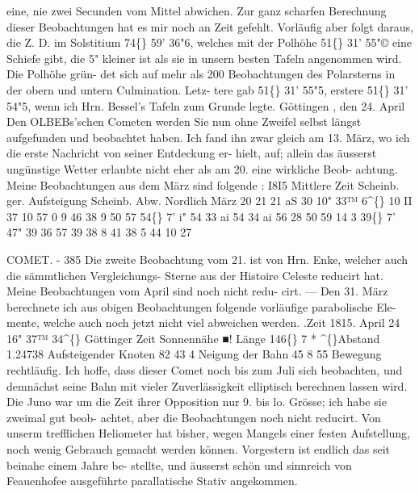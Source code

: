 \documentclass[12pt,a4paper]{article}
\newcommand{\degree}{\textdegree}
\begin{document}
eine,  nie  zwei  Secunden  vom  Mittel  abwichen. 
Zur  ganz  scharfen  Berechnung  dieser  Beobachtungen  hat  es  mir  noch  an  Zeit  gefehlt.  Vorläufig 
aber  folgt  daraus,  die  Z.  D.  im  Solstitium  74\degree\{\}  59'  36"6,  welches  mit  der  Polhöhe  51\degree\{\}  31'  55"©  eine 
Schiefe  gibt,  die  5"  kleiner  ist  als  sie  in  unsern  besten  Tafeln  angenommen  wird.  Die  Polhöhe  grün- 
det sich  auf  mehr  als  200  Beobachtungen  des  Polarsterns  in  der  obern  und  untern  Culmination.  Letz- 
tere gab  51\degree\{\}  31'  55"5,  erstere   51\degree\{\}  31'  54"5,  wenn  ich  Hrn.  Bessel's  Tafeln  zum  Grunde  legte. 
Göttingen ,  den  24.  April 
Den  OLBEBs'schen  Cometen  werden  Sie  nun  ohne  Zweifel  selbst  längst  aufgefunden  und  beobachtet 
haben.    Ich  fand  ihn  zwar  gleich  am   13.  März,  wo  ich  die  erste  Nachricht  von  seiner  Entdeckung  er- 
hielt, auf;  allein  das  äusserst  ungünstige  Wetter  erlaubte   nicht  eher  als   am  20.  eine  wirkliche  Beob- 
achtung.    Meine  Beobachtungen  aus  dem  März  sind  folgende : 
I8I5 
Mittlere  Zeit 
Scheinb.  ger. 
Aufsteigung 
Scheinb.  Abw. 
Nordlich 
März  20 
21 
21 
aS 
30 
10"  33™    6\textasciicircum\{\} 
10     II     37 
10    57      0 
9    46     38 
9     50     57 
54\degree\{\}     7'      i" 
54     33     ai 
54     34     ai 
56     28     50 
59     14       3 
39\degree\{\}     7'   47" 
39     36     57 
39     38       8 
41     38       5 
44     10     27 


\newpage
COMET.  -  385 
Die  zweite  Beobachtung  vom  21.  ist  von  Hrn.  Enke,  welcher  auch  die  sämmtlichen  Vergleichungs- 
Sterne  aus  der  Histoire  Celeste  reducirt  hat.  Meine  Beobachtungen  vom  April  sind  noch  nicht  redu- 
cirt.  ---  Den  31.  März  berechnete  ich  aus  obigen  Beobachtungen  folgende  vorläufige  parabolische  Ele- 
mente, welche  auch  noch  jetzt  nicht  viel  abweichen  werden. 
.Zeit  1815.  April  24 
  16"  37™  34\textasciicircum\{\}  Göttinger  Zeit 
Sonnennähe  ■!  Länge    146\degree\{\}    7      * 
\textasciicircum\{\}Abstand    1.24738 
Aufsteigender  Knoten    82    43      4 
Neigung  der  Bahn    45      8     55 
Bewegung  rechtläufig. 
Ich  hoffe,  dass  dieser  Comet  noch  bis  zum  Juli  sich  beobachten,  und  demnächst  seine  Bahn  mit 
vieler  Zuverlässigkeit  elliptisch  berechnen  lassen  wird. 
Die  Juno  war  um  die  Zeit  ihrer  Opposition  nur  9.  bis  lo.  Grösse;  ich  habe  sie  zweimal  gut  beob- 
achtet, aber  die  Beobachtungen  noch  nicht  reducirt. 
Von  unserm  trefflichen  Heliometer  hat  bisher,  wegen  Mangels  einer  festen  Aufstellung,  noch 
wenig  Gebrauch  gemacht  werden  können.  Vorgestern  ist  endlich  das  seit  beinahe  einem  Jahre  be- 
stellte, und  äusserst  schön  und  sinnreich  von  Feauenhofee  ausgeführte  parallatische  Stativ  angekommen. 
\end{document}
